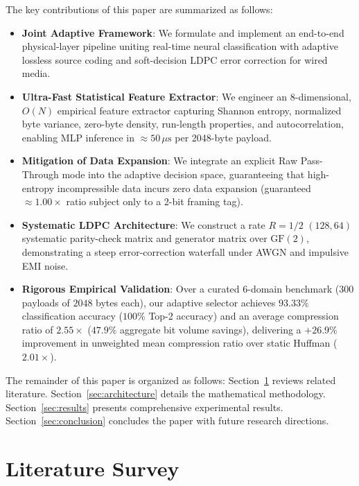 \documentclass[conference]{IEEEtran}
\begin{document}
The key contributions of this paper are summarized as follows:
\begin{itemize}
    \item \textbf{Joint Adaptive Framework}: We formulate and implement an end-to-end physical-layer pipeline uniting real-time neural classification with adaptive lossless source coding and soft-decision LDPC error correction for wired media.
    \item \textbf{Ultra-Fast Statistical Feature Extractor}: We engineer an $8$-dimensional, $O(N)$ empirical feature extractor capturing Shannon entropy, normalized byte variance, zero-byte density, run-length properties, and autocorrelation, enabling MLP inference in $\approx\!50\,\mu\text{s}$ per 2048-byte payload.
    \item \textbf{Mitigation of Data Expansion}: We integrate an explicit Raw Pass-Through mode into the adaptive decision space, guaranteeing that high-entropy incompressible data incurs zero data expansion (guaranteed $\approx\!1.00\times$ ratio subject only to a 2-bit framing tag).
    \item \textbf{Systematic LDPC Architecture}: We construct a rate $R=1/2$ $(128, 64)$ systematic parity-check matrix and generator matrix over $\text{GF}(2)$, demonstrating a steep error-correction waterfall under AWGN and impulsive EMI noise.
    \item \textbf{Rigorous Empirical Validation}: Over a curated 6-domain benchmark ($300$ payloads of $2048$ bytes each), our adaptive selector achieves $93.33\%$ classification accuracy ($100\%$ Top-2 accuracy) and an average compression ratio of $\mathbf{2.55\times}$ ($47.9\%$ aggregate bit volume savings), delivering a $+26.9\%$ improvement in unweighted mean compression ratio over static Huffman ($2.01\times$).
\end{itemize}

The remainder of this paper is organized as follows: Section~\ref{sec:literature} reviews related literature. Section~\ref{sec:architecture} details the mathematical methodology. Section~\ref{sec:results} presents comprehensive experimental results. Section~\ref{sec:conclusion} concludes the paper with future research directions.

\section{Literature Survey}
\label{sec:literature}
\end{document}
